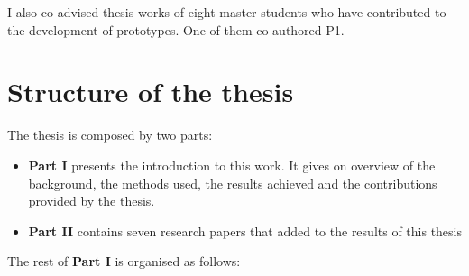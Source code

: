 I also co-advised thesis works of eight master students who have contributed to the development of prototypes. One of them co-authored P1.

\section{Structure of the thesis}\label{structure-of-the-thesis}

The thesis is composed by two parts:

\begin{itemize}
	\item \textbf{Part I} presents the introduction to this work. It gives on overview of the background, the methods used, the results achieved and the contributions provided by the thesis.
	\item \textbf{Part II} contains seven research papers that added to the results of this thesis
\end{itemize}

The rest of \textbf{Part I} is organised as follows:

